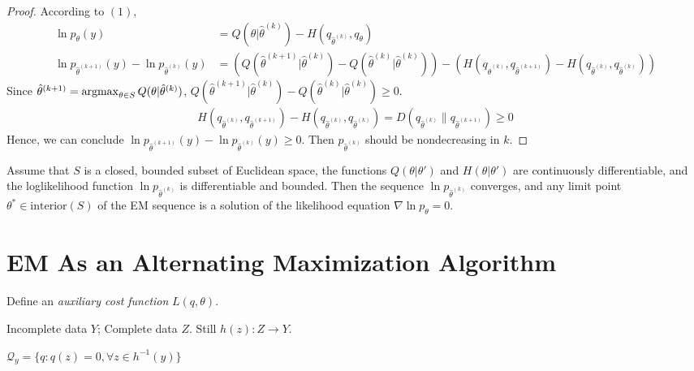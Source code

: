 \documentclass[11pt]{elegantbook}
\newcommand{\argmax}{\operatornamewithlimits{argmax}}
\begin{document}
\begin{proof}
    According to $(1)$,
    \begin{equation}
        \begin{aligned}
            \ln p_\theta (y)&=Q(\theta|\hat{\theta}^{(k)})-H(q_{\hat{\theta}^{(k)}},q_\theta)\\
            \ln p_{\hat{\theta}^{(k+1)}} (y)-\ln p_{\hat{\theta}^{(k)}} (y)&=(Q(\hat{\theta}^{(k+1)}|\hat{\theta}^{(k)})-Q(\hat{\theta}^{(k)}|\hat{\theta}^{(k)}))-(H(q_{\hat{\theta}^{(k)}},q_{\hat{\theta}^{(k+1)}})-H(q_{\hat{\theta}^{(k)}},q_{\hat{\theta}^{(k)}}))
        \end{aligned}
        \nonumber
    \end{equation}
    Since $\hat{\theta}^{(k+1)}=\argmax_{\theta\in S}Q(\theta|\hat{\theta}^{(k)})$, $Q(\hat{\theta}^{(k+1)}|\hat{\theta}^{(k)})-Q(\hat{\theta}^{(k)}|\hat{\theta}^{(k)})\geq 0$.
    \begin{equation}
        \begin{aligned}
            H(q_{\hat{\theta}^{(k)}},q_{\hat{\theta}^{(k+1)}})-H(q_{\hat{\theta}^{(k)}},q_{\hat{\theta}^{(k)}})=D(q_{\hat{\theta}^{(k)}}\| q_{\hat{\theta}^{(k+1)}})\geq 0
        \end{aligned}
        \nonumber
    \end{equation}
    Hence, we can conclude $\ln p_{\hat{\theta}^{(k+1)}} (y)-\ln p_{\hat{\theta}^{(k)}} (y)\geq 0$. Then $p_{\hat{\theta}^{(k)}}$ should be nondecreasing in $k$.
\end{proof}

\begin{corollary}
    Assume that $S$ is a closed, bounded subset of Euclidean space, the functions $Q(\theta|\theta')$ and $H(\theta|\theta')$ are continuously differentiable, and the loglikelihood function $\ln p_{\hat{\theta}^{(k)}}$ is differentiable and bounded. Then the sequence $\ln p_{\hat{\theta}^{(k)}}$ converges, and any limit point $\theta^*\in \text{interior}(S)$ of the EM sequence is a solution of the likelihood equation $\nabla \ln p_{\theta}=0$.
\end{corollary}


\section{EM As an Alternating Maximization Algorithm}
Define an \textit{auxiliary cost function} $L(q,\theta)$.

Incomplete data $Y$; Complete data $Z$. Still $h(z): Z \rightarrow Y$.

$\mathcal{Q}_y=\{q: q(z)=0, \forall z\in h^{-1}(y)\}$
\end{document}
